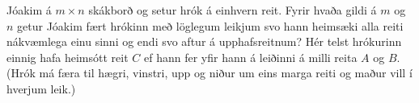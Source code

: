 Jóakim á $m \times n$ skákborð og setur hrók á einhvern reit. Fyrir hvaða gildi á $m$ og $n$ getur Jóakim fært hrókinn með löglegum leikjum svo hann heimsæki alla reiti nákvæmlega einu sinni og endi svo aftur á upphafsreitnum? Hér telst hrókurinn einnig hafa heimsótt reit $C$ ef hann fer yfir hann á leiðinni á milli reita $A$ og $B$. (Hrók má færa til hægri, vinstri, upp og niður um eins marga reiti og maður vill í hverjum leik.)